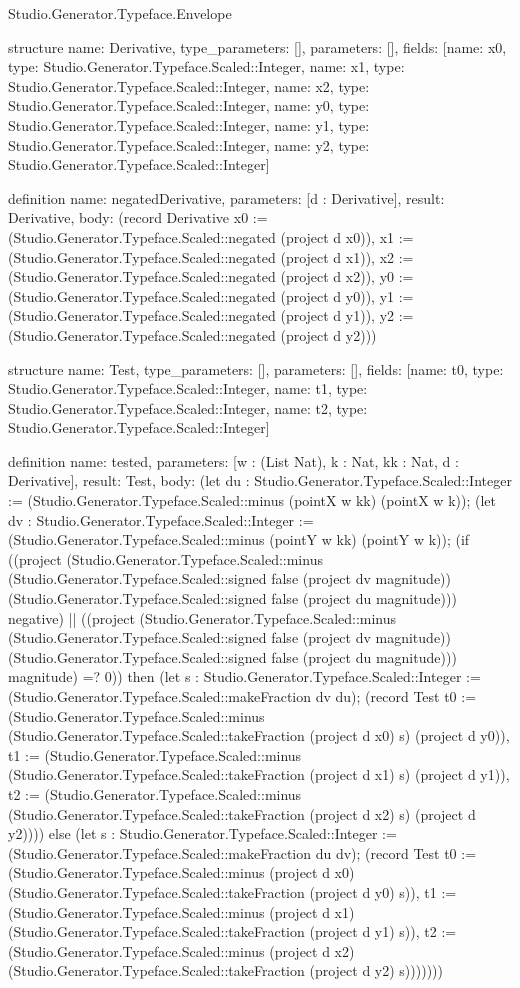 \begin{lexlean}{Studio.Generator.Typeface.Envelope}
\begin{semanticmodule}
structure{
  name: Derivative,
  type_parameters: [],
  parameters: [],
  fields: [{name: x0, type: Studio.Generator.Typeface.Scaled::Integer}, {name: x1, type: Studio.Generator.Typeface.Scaled::Integer}, {name: x2, type: Studio.Generator.Typeface.Scaled::Integer}, {name: y0, type: Studio.Generator.Typeface.Scaled::Integer}, {name: y1, type: Studio.Generator.Typeface.Scaled::Integer}, {name: y2, type: Studio.Generator.Typeface.Scaled::Integer}]
}

definition{
  name: negatedDerivative,
  parameters: [d : Derivative],
  result: Derivative,
  body: (record Derivative {x0 := (Studio.Generator.Typeface.Scaled::negated (project d x0)), x1 := (Studio.Generator.Typeface.Scaled::negated (project d x1)), x2 := (Studio.Generator.Typeface.Scaled::negated (project d x2)), y0 := (Studio.Generator.Typeface.Scaled::negated (project d y0)), y1 := (Studio.Generator.Typeface.Scaled::negated (project d y1)), y2 := (Studio.Generator.Typeface.Scaled::negated (project d y2))})
}

structure{
  name: Test,
  type_parameters: [],
  parameters: [],
  fields: [{name: t0, type: Studio.Generator.Typeface.Scaled::Integer}, {name: t1, type: Studio.Generator.Typeface.Scaled::Integer}, {name: t2, type: Studio.Generator.Typeface.Scaled::Integer}]
}

definition{
  name: tested,
  parameters: [w : (List Nat), k : Nat, kk : Nat, d : Derivative],
  result: Test,
  body: (let du : Studio.Generator.Typeface.Scaled::Integer := (Studio.Generator.Typeface.Scaled::minus (pointX w kk) (pointX w k)); (let dv : Studio.Generator.Typeface.Scaled::Integer := (Studio.Generator.Typeface.Scaled::minus (pointY w kk) (pointY w k)); (if ((project (Studio.Generator.Typeface.Scaled::minus (Studio.Generator.Typeface.Scaled::signed false (project dv magnitude)) (Studio.Generator.Typeface.Scaled::signed false (project du magnitude))) negative) || ((project (Studio.Generator.Typeface.Scaled::minus (Studio.Generator.Typeface.Scaled::signed false (project dv magnitude)) (Studio.Generator.Typeface.Scaled::signed false (project du magnitude))) magnitude) =? 0)) then (let s : Studio.Generator.Typeface.Scaled::Integer := (Studio.Generator.Typeface.Scaled::makeFraction dv du); (record Test {t0 := (Studio.Generator.Typeface.Scaled::minus (Studio.Generator.Typeface.Scaled::takeFraction (project d x0) s) (project d y0)), t1 := (Studio.Generator.Typeface.Scaled::minus (Studio.Generator.Typeface.Scaled::takeFraction (project d x1) s) (project d y1)), t2 := (Studio.Generator.Typeface.Scaled::minus (Studio.Generator.Typeface.Scaled::takeFraction (project d x2) s) (project d y2))})) else (let s : Studio.Generator.Typeface.Scaled::Integer := (Studio.Generator.Typeface.Scaled::makeFraction du dv); (record Test {t0 := (Studio.Generator.Typeface.Scaled::minus (project d x0) (Studio.Generator.Typeface.Scaled::takeFraction (project d y0) s)), t1 := (Studio.Generator.Typeface.Scaled::minus (project d x1) (Studio.Generator.Typeface.Scaled::takeFraction (project d y1) s)), t2 := (Studio.Generator.Typeface.Scaled::minus (project d x2) (Studio.Generator.Typeface.Scaled::takeFraction (project d y2) s))})))))
}


\end{semanticmodule}
\end{lexlean}
